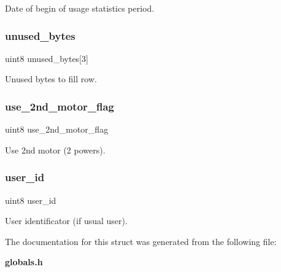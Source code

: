 Date of begin of usage statistics period. \mbox{\label{structst__device_aa1537c1e30116f5e2ee8dee11239a067}} 
\subsubsection{unused\+\_\+bytes}
{\footnotesize\ttfamily uint8 unused\+\_\+bytes[3]}

Unused bytes to fill row. \mbox{\label{structst__device_a0fccac3f6be3d4a46e0165630c61915c}} 
\subsubsection{use\+\_\+2nd\+\_\+motor\+\_\+flag}
{\footnotesize\ttfamily uint8 use\+\_\+2nd\+\_\+motor\+\_\+flag}

Use 2nd motor (2 powers). \mbox{\label{structst__device_ad9392e6d3c353068737d39075256a397}} 
\subsubsection{user\+\_\+id}
{\footnotesize\ttfamily uint8 user\+\_\+id}

User identificator (if usual user). 

The documentation for this struct was generated from the following file\+:\begin{DoxyCompactItemize}
\item 
\textbf{ globals.\+h}\end{DoxyCompactItemize}
